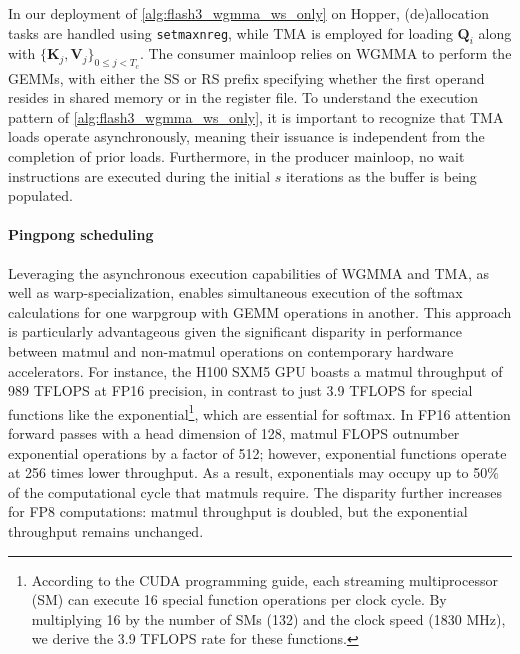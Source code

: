 \begin{enumerate}
In our deployment of \cref{alg:flash3_wgmma_ws_only} on Hopper, (de)allocation tasks are handled using \verb|setmaxnreg|, while TMA is employed for loading $\mathbf{Q}_i$ along with $\{ \mathbf{K}_j, \mathbf{V}_j \}_{0 \leq j < T_c}$. The consumer mainloop relies on WGMMA to perform the GEMMs, with either the SS or RS prefix specifying whether the first operand resides in shared memory or in the register file. To understand the execution pattern of \cref{alg:flash3_wgmma_ws_only}, it is important to recognize that TMA loads operate asynchronously, meaning their issuance is independent from the completion of prior loads. Furthermore, in the producer mainloop, no wait instructions are executed during the initial $s$ iterations as the buffer is being populated.

\paragraph{Pingpong scheduling} Leveraging the asynchronous execution capabilities of WGMMA and TMA, as well as warp-specialization, enables simultaneous execution of the softmax calculations for one warpgroup with GEMM operations in another. This approach is particularly advantageous given the significant disparity in performance between matmul and non-matmul operations on contemporary hardware accelerators. For instance, the H100 SXM5 GPU boasts a matmul throughput of 989 TFLOPS at FP16 precision, in contrast to just 3.9 TFLOPS for special functions like the exponential\footnote{According to the CUDA programming guide, each streaming multiprocessor (SM) can execute 16 special function operations per clock cycle. By multiplying 16 by the number of SMs (132) and the clock speed (1830 MHz), we derive the 3.9 TFLOPS rate for these functions.}, which are essential for softmax. In FP16 attention forward passes with a head dimension of 128, matmul FLOPS outnumber exponential operations by a factor of 512; however, exponential functions operate at 256 times lower throughput. As a result, exponentials may occupy up to 50\% of the computational cycle that matmuls require. The disparity further increases for FP8 computations: matmul throughput is doubled, but the exponential throughput remains unchanged.


\end{enumerate}

